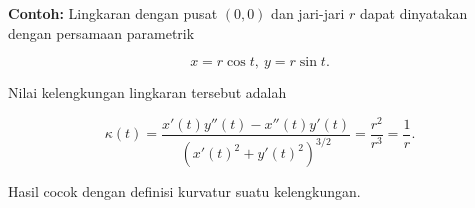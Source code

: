 \documentclass[a4paper,11pt,oneside,enabledeprecatedfontcommands]{scrbook}
\newenvironment{eulernotebook}{}{}
\newenvironment{eulercomment}{\par\medskip\noindent}{\par\medskip}
\newenvironment{eulerformula}{}{}
\begin{document}
\begin{eulernotebook}
\begin{eulercomment}
\textbf{Contoh:} Lingkaran dengan pusat $(0,0)$ dan jari-jari $r$ dapat dinyatakan dengan persamaan parametrik
\end{eulercomment}
\begin{eulerformula}
\[
x=r\cos t,\ y=r\sin t.
\]
\end{eulerformula}
\begin{eulercomment}
Nilai kelengkungan lingkaran tersebut adalah
\end{eulercomment}
\begin{eulerformula}
\[
\kappa(t)=\frac{x'(t)y''(t)-x''(t)y'(t)}{\left(x'(t)^2+y'(t)^2\right)^{3/2}}=\frac{r^2}{r^3}=\frac 1 r.
\]
\end{eulerformula}
\begin{eulercomment}
Hasil cocok dengan definisi kurvatur suatu kelengkungan.


\end{eulercomment}
\end{eulernotebook}
\end{document}
